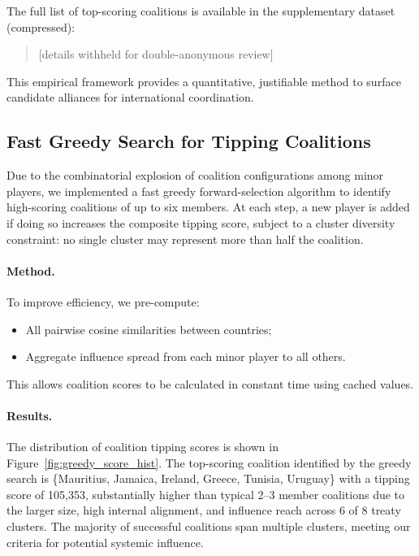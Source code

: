\documentclass[11pt]{article}
\begin{document}
The full list of top-scoring coalitions is available in the supplementary dataset (compressed):
\begin{quote}
	[details withheld for double-anonymous review]
\end{quote}

This empirical framework provides a quantitative, justifiable method to surface candidate alliances for international coordination.

\subsection{Fast Greedy Search for Tipping Coalitions}
\label{sec:greedy_coalitions}

Due to the combinatorial explosion of coalition configurations among minor players, we implemented a fast greedy forward-selection algorithm to identify high-scoring coalitions of up to six members. At each step, a new player is added if doing so increases the composite tipping score, subject to a cluster diversity constraint: no single cluster may represent more than half the coalition.

\paragraph{Method.}
To improve efficiency, we pre-compute:
\begin{itemize}
	\item All pairwise cosine similarities between countries;
	\item Aggregate influence spread from each minor player to all others.
\end{itemize}

This allows coalition scores to be calculated in constant time using cached values.

\paragraph{Results.}
The distribution of coalition tipping scores is shown in Figure~\ref{fig:greedy_score_hist}. The top-scoring coalition identified by the greedy search is \{Mauritius, Jamaica, Ireland, Greece, Tunisia, Uruguay\} with a tipping score of 105{,}353, substantially higher than typical 2--3 member coalitions due to the larger size, high internal alignment, and influence reach across 6 of 8 treaty clusters. The majority of successful coalitions span multiple clusters, meeting our criteria for potential systemic influence.
\end{document}
